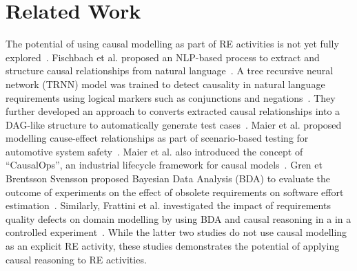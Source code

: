 \section{Related Work}
The potential of using causal modelling as part of RE activities is not yet fully explored~\cite{giamattei2024}. Fischbach et al. proposed an NLP-based process to extract and structure causal relationships from natural language~\cite{fischbach2020, fischbach2021}. A tree recursive neural network (TRNN) model was trained to detect causality in natural language requirements using logical markers such as conjunctions and negations~\cite{jadallah2021}. They further developed an approach to converts extracted causal relationships into a DAG-like structure to automatically generate test cases~\cite{fischbach2023}.
Maier et al. proposed modelling cause-effect relationships as part of scenario-based testing for automotive system safety~\cite{maier2022}. Maier et al. also introduced the concept of ``CausalOps'', an industrial lifecycle framework for causal models~\cite{maier2024}.
Gren et Brentsson Svensson proposed Bayesian Data Analysis (BDA) to evaluate the outcome of experiments on the effect of obsolete requirements on software effort estimation~\cite{gren2021}. Similarly, Frattini et al. investigated the impact of requirements quality defects on domain modelling by using BDA and causal reasoning in a in a controlled experiment~\cite{frattini2025}. While the latter two studies do not use causal modelling as an explicit RE activity, these studies demonstrates the potential of applying causal reasoning to RE activities.